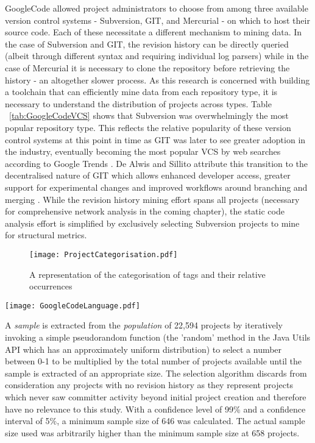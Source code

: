GoogleCode allowed project administrators to choose from among three available version control systems - Subversion, GIT, and Mercurial - on which to host their source code. Each of these necessitate a different mechanism to mining data. In the case of Subversion and GIT, the revision history can be directly queried (albeit through different syntax and requiring individual log parsers) while in the case of Mercurial it is necessary to clone the repository before retrieving the history - an altogether slower process. As this research is concerned with building a toolchain that can efficiently mine data from each repository type, it is necessary to understand the distribution of projects across types. Table ~\ref{tab:GoogleCodeVCS} shows that Subversion was overwhelmingly the most popular repository type. This reflects the relative popularity of these version control systems at this point in time as GIT was later to see greater adoption in the industry, eventually becoming the most popular VCS by web searches according to Google Trends \citep{rhodecode}. De Alwis and Sillito attribute this transition to the decentralised nature of GIT which allows enhanced developer access, greater support for experimental changes and improved workflows around branching and merging \citep{de2009software}. While the revision history mining effort spans all projects (necessary for comprehensive network analysis in the coming chapter), the static code analysis effort is simplified by exclusively selecting Subversion projects to mine for structural metrics.

\begin{figure}[htbp!] 
\centering    
\texttt{[image: ProjectCategorisation.pdf]}
\caption{A representation of the categorisation of tags and their relative occurrences}
\label{fig:ProjectCategorisation}
\end{figure}

\begin{table}
\centering 
{}
\begin{tabular}
 \centering 
 \texttt{[image: GoogleCodeLanguage.pdf]}
 \label{tab:GoogleCodeLanguage}
\end{tabular}
\end{table}

A \textit{sample} is extracted from the \textit{population} of 22,594 projects by iteratively invoking a simple pseudorandom function (the 'random' method in the Java Utils API which has an approximately uniform distribution) to select a number between 0-1 to be multiplied by the total number of projects available until the sample is extracted of an appropriate size. The selection algorithm discards from consideration any projects with no revision history as they represent projects which never saw committer activity beyond initial project creation and therefore have no relevance to this study. With a confidence level of 99\% and a confidence interval of 5\%, a minimum sample size of 646 was calculated. The actual sample size used was arbitrarily higher than the minimum sample size at 658 projects. 

